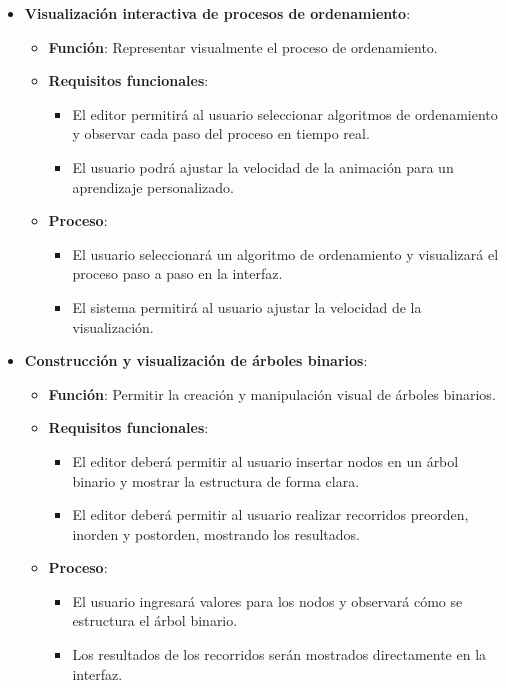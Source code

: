 \documentclass[stu, 12pt, letterpaper, donotrepeattitle, floatsintext, natbib]{apa7}
\begin{document}
\begin{itemize}
    \item \textbf{Visualización interactiva de procesos de ordenamiento}:
    \begin{itemize}
        \item \textbf{Función}: Representar visualmente el proceso de ordenamiento.
        \item \textbf{Requisitos funcionales}:
            \begin{itemize}
                \item El editor permitirá al usuario seleccionar algoritmos de ordenamiento y observar cada paso del proceso en tiempo real.
                \item El usuario podrá ajustar la velocidad de la animación para un aprendizaje personalizado.
            \end{itemize}
        \item \textbf{Proceso}:
            \begin{itemize}
                \item El usuario seleccionará un algoritmo de ordenamiento y visualizará el proceso paso a paso en la interfaz.
                \item El sistema permitirá al usuario ajustar la velocidad de la visualización.
            \end{itemize}
    \end{itemize}

    \item \textbf{Construcción y visualización de árboles binarios}:
    \begin{itemize}
        \item \textbf{Función}: Permitir la creación y manipulación visual de árboles binarios.
        \item \textbf{Requisitos funcionales}:
            \begin{itemize}
                \item El editor deberá permitir al usuario insertar nodos en un árbol binario y mostrar la estructura de forma clara.
                \item El editor deberá permitir al usuario realizar recorridos preorden, inorden y postorden, mostrando los resultados.
            \end{itemize}
        \item \textbf{Proceso}:
            \begin{itemize}
                \item El usuario ingresará valores para los nodos y observará cómo se estructura el árbol binario.
                \item Los resultados de los recorridos serán mostrados directamente en la interfaz.
            \end{itemize}
    \end{itemize}


\end{itemize}
\end{document}
